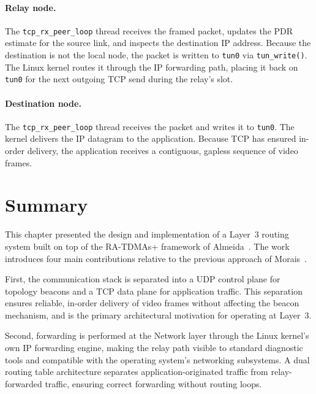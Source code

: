 \paragraph{Relay node.}
The \texttt{tcp\_rx\_peer\_loop} thread receives the framed packet, updates the PDR estimate
for the source link, and inspects the destination IP address. Because the destination is not
the local node, the packet is written to \texttt{tun0} via \texttt{tun\_write()}. The Linux
kernel routes it through the IP forwarding path, placing it back on \texttt{tun0} for the
next outgoing TCP send during the relay's slot.

\paragraph{Destination node.}
The \texttt{tcp\_rx\_peer\_loop} thread receives the packet and writes it to \texttt{tun0}.
The kernel delivers the IP datagram to the application. Because TCP has ensured in-order
delivery, the application receives a contiguous, gapless sequence of video frames.



\section{Summary}
\label{sec:impl-summary}

This chapter presented the design and implementation of a Layer~3 routing system built on
top of the RA-TDMAs+ framework of Almeida~\cite{almeida2023synchronization}. The work
introduces four main contributions relative to the previous approach of
Morais~\cite{morais2024synchronization}.

First, the communication stack is separated into a UDP control plane for topology beacons
and a TCP data plane for application traffic. This separation ensures reliable, in-order
delivery of video frames without affecting the beacon mechanism, and is the primary
architectural motivation for operating at Layer~3.

Second, forwarding is performed at the Network layer through the Linux kernel's own IP
forwarding engine, making the relay path visible to standard diagnostic tools and
compatible with the operating system's networking subsystems. A dual routing table
architecture separates application-originated traffic from relay-forwarded traffic, ensuring
correct forwarding without routing loops.

